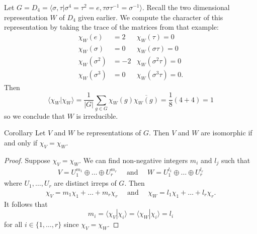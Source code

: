 \begin{frame}
\begin{example}
Let $G=D_4=  \langle \sigma, \tau |  \sigma^4 = \tau^2 = e, \tau \sigma \tau^{-1} = \sigma^{-1} \rangle$.  Recall the two dimensional representation $W$ of $D_4$ given earlier.
We compute the character of this representation by taking the trace of the matrices from that example:
\begin{align*}
\chi_W(e) &=2 & \chi_W(\tau) = 0 \\
\chi_W(\sigma) &= 0 &\chi_W (\sigma \tau) = 0 \\
\chi_W(\sigma^2) &= -2 &\chi_W (\sigma^2 \tau) = 0 \\
\chi_W(\sigma^3) &= 0 &\chi_W (\sigma^3 \tau) = 0.
\end{align*}
Then
\[ \langle \chi_W | \chi_W \rangle =\frac {1}{|G|} \sum_{g \in G} \chi_W (g) \overline{\chi_W (g)} = \frac{1}{8} (4 + 4) = 1\]
so we conclude that $W$ is irreducible.
\end{example}
\end{frame}


\begin{frame}[plain]
\begin{block}{Corollary}
Let $V$ and $W$ be representations of $G$.  Then $V$ and $W$ are isomorphic if and only if $\chi_V = \chi_W$.
\end{block}
\begin{proof}
Suppose $\chi_V = \chi_W$. We can find non-negative integers $m_i$ and $l_j$ such that
\begin{align*}
V = U_1^{m_1} \oplus \ldots \oplus U_r^{m_r} \quad \text{ and } \quad W = U_1^{l_1} \oplus \ldots \oplus U_r^{l_r}
\end{align*}
where $U_1, \ldots, U_r$ are distinct irreps of $G$.  Then
\begin{align*}
\chi_V = m_1 \chi_1 + \ldots + m_r \chi_r \quad \text{ and } \quad  \chi_W = l_1 \chi_1 + \ldots + l_r \chi_r .
\end{align*}
It follows that
\[ m_i = \langle \chi_V | \chi_i \rangle   = \langle \chi_W | \chi_i \rangle =  l_i \]
for all $i \in \{1, \ldots, r \}$ since $\chi_V = \chi_W$.
\end{proof}
\end{frame}

